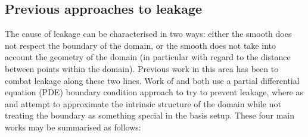 \subsection{Previous approaches to leakage}

The cause of leakage can be characterised in two ways: either the smooth does not respect the boundary of the domain, or the smooth does not take into account the geometry of the domain (in particular with regard to the distance between points within the domain). Previous work in this area has been to combat leakage along these two lines. Work of \cite{ramsay} and \cite{soap} both use a partial differential equation (PDE) boundary condition approach to try to prevent leakage, where as \cite{wangranalli} and \cite{eilerstalk}  attempt to approximate the intrinsic structure of the domain while not treating the boundary as something special in the basis setup. These four main works may be summarised as follows:

